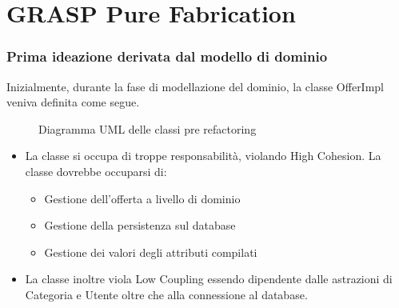 \section{GRASP Pure Fabrication}

\begin{frame}
    \frametitle{Prima ideazione derivata dal modello di dominio}
    Inizialmente, durante la fase di modellazione del dominio, la classe OfferImpl veniva definita come segue.

    \begin{minipage}{.29\textwidth}
        \begin{figure}
            \centering
            \caption{Diagramma UML delle classi pre refactoring}
        \end{figure}
    \end{minipage}
    \begin{minipage}{.68\textwidth}
        \begin{itemize}
            \item<1-> La classe si occupa di troppe responsabilità, violando High Cohesion. La classe dovrebbe occuparsi di:
            \begin{itemize}
                \item Gestione dell'offerta a livello di dominio
                \item Gestione della persistenza sul database
                \item Gestione dei valori degli attributi compilati
            \end{itemize}
            \item<2-> La classe inoltre viola Low Coupling essendo dipendente dalle astrazioni di Categoria e Utente oltre che alla connessione al database.
        \end{itemize}
    \end{minipage}
\end{frame}

